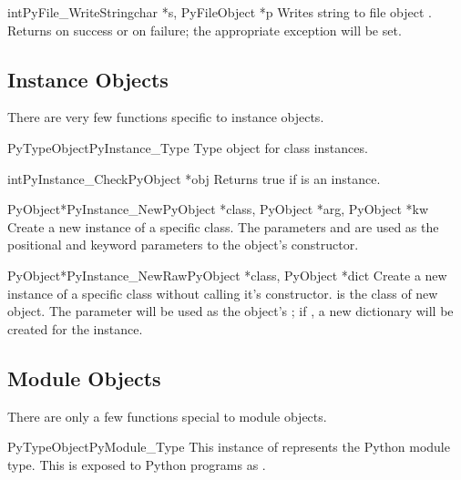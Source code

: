 \documentclass{manual}
\begin{document}
\begin{cfuncdesc}{int}{PyFile_WriteString}{char *s, PyFileObject *p}
Writes string  to file object .  Returns  on
success or  on failure; the appropriate exception will be
set.
\end{cfuncdesc}


\subsection{Instance Objects \label{instanceObjects}}

There are very few functions specific to instance objects.

\begin{cvardesc}{PyTypeObject}{PyInstance_Type}
  Type object for class instances.
\end{cvardesc}

\begin{cfuncdesc}{int}{PyInstance_Check}{PyObject *obj}
  Returns true if  is an instance.
\end{cfuncdesc}

\begin{cfuncdesc}{PyObject*}{PyInstance_New}{PyObject *class,
                                             PyObject *arg,
                                             PyObject *kw}
  Create a new instance of a specific class.  The parameters 
  and  are used as the positional and keyword parameters to
  the object's constructor.
\end{cfuncdesc}

\begin{cfuncdesc}{PyObject*}{PyInstance_NewRaw}{PyObject *class,
                                                PyObject *dict}
  Create a new instance of a specific class without calling it's
  constructor.   is the class of new object.  The
   parameter will be used as the object's ;
  if \NULL, a new dictionary will be created for the instance.
\end{cfuncdesc}


\subsection{Module Objects \label{moduleObjects}}

There are only a few functions special to module objects.

\begin{cvardesc}{PyTypeObject}{PyModule_Type}
This instance of  represents the Python module
type.  This is exposed to Python programs as .
\end{cvardesc}
\end{document}

